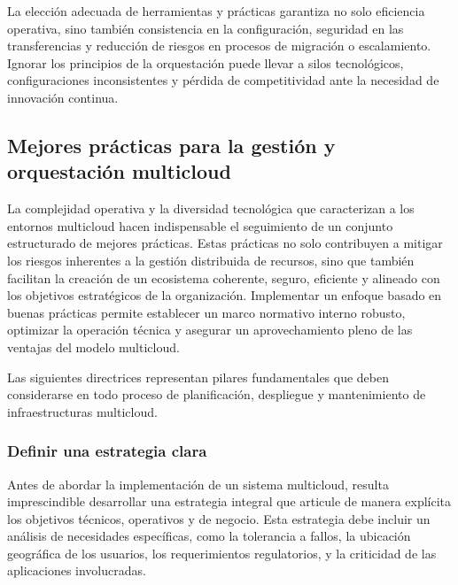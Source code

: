 {            La elección adecuada de herramientas y prácticas garantiza no solo eficiencia operativa, sino también consistencia en la configuración, seguridad en las transferencias y reducción de riesgos en procesos de migración o escalamiento. Ignorar los principios de la orquestación puede llevar a silos tecnológicos, configuraciones inconsistentes y pérdida de competitividad ante la necesidad de innovación continua.

        \subsection{Mejores prácticas para la gestión y orquestación multicloud}
            La complejidad operativa y la diversidad tecnológica que caracterizan a los entornos multicloud hacen indispensable el seguimiento de un conjunto estructurado de mejores prácticas. Estas prácticas no solo contribuyen a mitigar los riesgos inherentes a la gestión distribuida de recursos, sino que también facilitan la creación de un ecosistema coherente, seguro, eficiente y alineado con los objetivos estratégicos de la organización. Implementar un enfoque basado en buenas prácticas permite establecer un marco normativo interno robusto, optimizar la operación técnica y asegurar un aprovechamiento pleno de las ventajas del modelo multicloud.
                
            Las siguientes directrices representan pilares fundamentales que deben considerarse en todo proceso de planificación, despliegue y mantenimiento de infraestructuras multicloud.
                
            \subsubsection{Definir una estrategia clara}
                Antes de abordar la implementación de un sistema multicloud, resulta imprescindible desarrollar una estrategia integral que articule de manera explícita los objetivos técnicos, operativos y de negocio. Esta estrategia debe incluir un análisis de necesidades específicas, como la tolerancia a fallos, la ubicación geográfica de los usuarios, los requerimientos regulatorios, y la criticidad de las aplicaciones involucradas.
                
}
